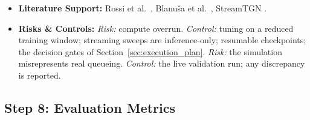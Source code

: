 \documentclass[11pt,a4paper]{article}
\begin{document}
\begin{itemize}[leftmargin=*]
    \item \textbf{Literature Support:} Rossi et al.\ \cite{rossi2020tgn}, Blanu\v{s}a et al.\ \cite{blanusa2024gfp}, StreamTGN \cite{streamtgn2026}.
    \item \textbf{Risks \& Controls:} \textit{Risk:} compute overrun. \textit{Control:} tuning on a reduced training window; streaming sweeps are inference-only; resumable checkpoints; the decision gates of Section~\ref{sec:execution_plan}. \textit{Risk:} the simulation misrepresents real queueing. \textit{Control:} the live validation run; any discrepancy is reported.
\end{itemize}

\subsection{Step 8: Evaluation Metrics}
\end{document}
